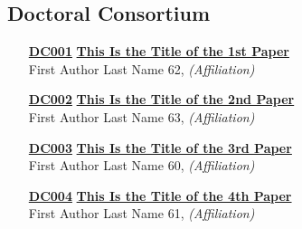 \subsection{Doctoral Consortium}
\begin{enumerate}
\item[\href{https://doi.org/10.1145/1122445.1122456}{\textbf{DC001}}]
\href{https://doi.org/10.1145/1122445.1122456}{\textbf{This Is the Title of the 1st Paper}}\\
First Author Last Name 62, \emph{(Affiliation)}\\

\item[\href{https://doi.org/10.1145/1122445.1122456}{\textbf{DC002}}]
\href{https://doi.org/10.1145/1122445.1122456}{\textbf{This Is the Title of the 2nd Paper}}\\
First Author Last Name 63, \emph{(Affiliation)}\\

\item[\href{https://doi.org/10.1145/1122445.1122456}{\textbf{DC003}}]
\href{https://doi.org/10.1145/1122445.1122456}{\textbf{This Is the Title of the 3rd Paper}}\\
First Author Last Name 60, \emph{(Affiliation)}\\

\item[\href{https://doi.org/10.1145/1122445.1122456}{\textbf{DC004}}]
\href{https://doi.org/10.1145/1122445.1122456}{\textbf{This Is the Title of the 4th Paper}}\\
First Author Last Name 61, \emph{(Affiliation)}\\
\end{enumerate}


